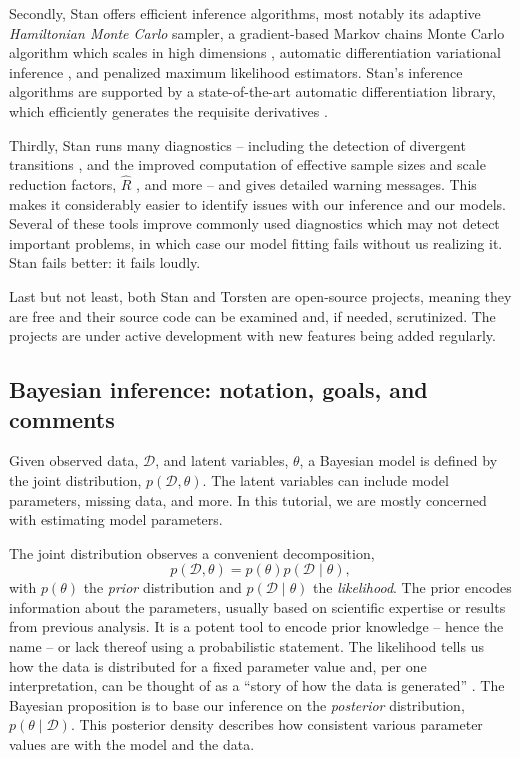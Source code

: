 Secondly, Stan offers efficient inference algorithms, most notably its adaptive \textit{Hamiltonian Monte Carlo} sampler, a gradient-based Markov chains Monte Carlo algorithm which scales in high dimensions \cite{Betancourt:2018, Hoffman:2014}, automatic differentiation variational inference \cite{author:0000}, and penalized maximum likelihood estimators.
Stan's inference algorithms are supported by a state-of-the-art automatic differentiation library, which efficiently generates the requisite derivatives \cite{Carpenter:2015}.

Thirdly, Stan runs many diagnostics -- including the detection of divergent transitions \cite{Betancourt:2018}, and the improved computation of effective sample sizes and scale reduction factors, $\hat R$ \cite{Vehtari:2020}, and more -- and gives detailed warning messages.
This makes it considerably easier to identify issues with our inference and our models.
Several of these tools improve commonly used diagnostics which may not detect important problems, in which case our model fitting fails without us realizing it.
Stan fails better: it fails loudly. 

Last but not least, both Stan and Torsten are open-source projects, meaning  they are free and their source code can be examined and, if needed, scrutinized. 
The projects are under active development with new features being added regularly.

\subsection{Bayesian inference: notation, goals, and comments}

Given observed data, $\mathcal D$, and latent variables, $\theta$, a Bayesian model is defined by the joint distribution, $p(\mathcal D, \theta)$.
The latent variables can include model parameters, missing data, and more.
In this tutorial, we are mostly concerned with estimating model parameters.

The joint distribution observes a convenient decomposition,
\begin{equation*}
  p(\mathcal D, \theta) = p(\theta) p(\mathcal D \mid \theta),
\end{equation*}
%
with $p(\theta)$ the \textit{prior} distribution and $p(\mathcal D \mid \theta)$ the \textit{likelihood}.
The prior encodes information about the parameters, usually based on scientific expertise or results from previous analysis.
It is a potent tool to encode prior knowledge -- hence the name -- or lack thereof using a probabilistic statement.
The likelihood tells us how the data is distributed for a fixed parameter value and, per one interpretation, can be thought of as a ``story of how the data is generated'' \cite{Gelman:2013}.
%
The Bayesian proposition is to base our inference on the \textit{posterior} distribution, $p(\theta \mid \mathcal D)$.
This posterior density describes how consistent various parameter values are with the model and the data.

